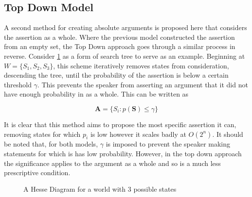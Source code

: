 \subsection{Top Down Model}

A second method for creating absolute arguments is proposed here that considers the assertion as a whole. Where the previous model constructed the assertion from an empty set, the Top Down approach goes through a similar process in reverse. Consider \cref{fig:hesse} as a form of search tree to serve as an example. Beginning at $W = \{S_1, S_2, S_3 \}$, this scheme iteratively removes states from consideration, descending the tree, until the probability of the assertion is below a certain threshold $\gamma$. This prevents the speaker from asserting an argument that it did not have enough probability in as a whole. This can be written as 

\begin{equation} \label{eq:TD_approach}
    \mathbf{A} = \{ S_i: p(\mathbf{S}) \leq \gamma  \}
\end{equation}


It is clear that this method aims to propose the most specific assertion it can, removing states for which $p_i$ is low however it scales badly at $O(2^n)$. It should be noted that, for both models, $\gamma$ is imposed to prevent the speaker making statements for which is has low probability. However, in the top down approach the significance applies to the argument as a whole and so is a much less prescriptive condition. 


\begin{figure}[H]
    \centering
    \caption{A Hesse Diagram for a world with 3 possible states}
    \label{fig:hesse}
\end{figure}
